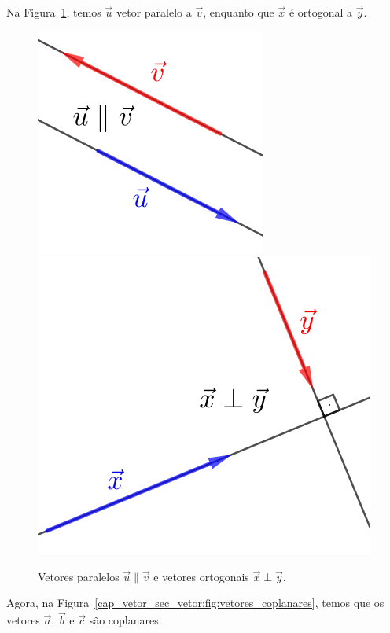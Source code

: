 \begin{ex}
  Na Figura~\ref{cap_vetor_sec_vetor:fig:vetores_pararel_perp}, temos $\vec{u}$ vetor paralelo a $\vec{v}$, enquanto que $\vec{x}$ é ortogonal a $\vec{y}$.

  \begin{figure}[h]
    \centering
    \includegraphics{./cap_vetor/dados/fig_vetores_paralelos/fig.png} ~
    \includegraphics{./cap_vetor/dados/fig_vetores_ortogonais/fig.png}
    \caption{Vetores paralelos $\vec{u}\parallel\vec{v}$ e vetores ortogonais $\vec{x}\perp\vec{y}$.}
    \label{cap_vetor_sec_vetor:fig:vetores_pararel_perp}
  \end{figure}

  Agora, na Figura~\ref{cap_vetor_sec_vetor:fig:vetores_coplanares}, temos que os vetores $\vec{a}$, $\vec{b}$ e $\vec{c}$ são coplanares.


\end{ex}
